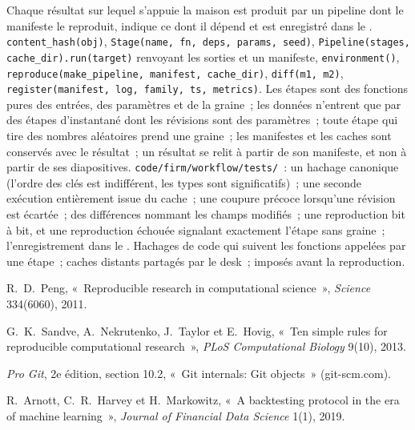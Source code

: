 \begin{build}
 Chaque résultat sur lequel s'appuie la maison est produit par un pipeline dont le manifeste le reproduit, indique ce dont il dépend et est enregistré dans le
.
 \texttt{content\_hash(obj)}, \texttt{Stage(name, fn, deps, params, seed)}, \texttt{Pipeline(stages, cache\_dir).run(target)} renvoyant les sorties et
un manifeste, \texttt{environment()}, \texttt{reproduce(make\_pipeline, manifest, cache\_dir)}, \texttt{diff(m1, m2)}, \texttt{register(manifest, log, family, ts,
metrics)}.
 Les étapes sont des fonctions pures des entrées, des paramètres et de la graine~; les données n'entrent que par des étapes d'instantané dont les révisions sont des paramètres~; toute étape qui
tire des nombres aléatoires prend une graine~; les manifestes et les caches sont conservés avec le résultat~; un résultat se relit à partir de son manifeste, et non à partir de ses diapositives.
 \texttt{code/firm/workflow/tests/}~: un hachage canonique (l'ordre des clés est indifférent, les types sont significatifs)~; une seconde exécution entièrement issue du cache~; une coupure
précoce lorsqu'une révision est écartée~; des différences nommant les champs modifiés~; une reproduction bit à bit, et une reproduction échouée signalant exactement l'étape sans graine~;
l'enregistrement dans le .
 Hachages de code qui suivent les fonctions appelées par une étape~; caches distants partagés par le desk~;  imposés avant la reproduction.
\end{build}

\begin{omsources}
\item R.~D.~Peng, «~Reproducible research in computational science~», \emph{Science} 334(6060), 2011.
\item G.~K.~Sandve, A.~Nekrutenko, J.~Taylor et E.~Hovig, «~Ten simple rules for reproducible computational research~», \emph{PLoS Computational Biology} 9(10),
2013.
\item \emph{Pro Git}, 2e édition, section 10.2, «~Git internals: Git objects~» (git-scm.com).
\item R.~Arnott, C.~R.~Harvey et H.~Markowitz, «~A backtesting protocol in the era of machine learning~», \emph{Journal of Financial Data Science} 1(1), 2019.
\end{omsources}

